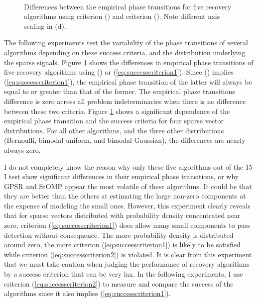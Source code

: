 \documentclass[11pt,draftcls,onecolumn]{IEEEtran}
\begin{document}
\begin{figure}[tb]
\centering
{}\hspace{-0.1in}
\\
\hspace{-0.1in}
\caption{Differences between the empirical phase transitions for 
five recovery algorithms using criterion ()
and criterion ().
Note different axis scaling in (d).}
\label{fig:Phasedifferencesrecoverycriterion}
\end{figure}

The following experiments test the variability of the phase transitions of
several algorithms depending on these success criteria,
and the distribution underlying the sparse signals.
Figure \ref{fig:Phasedifferencesrecoverycriterion} 
shows the differences in empirical phase transitions of five 
recovery algorithms using () or (\ref{eq:successcriterion1}).
Since () implies (\ref{eq:successcriterion1}),
the empirical phase transition of the latter will always be equal to or greater 
than that of the former.
The empirical phase transitions difference is zero across all problem indeterminacies
when there is no difference between these two criteria.
Figure \ref{fig:Phasedifferencesrecoverycriterion} shows 
a significant dependence of the empirical phase transition
and the success criteria for four sparse vector distributions.
For all other algorithms, and the three other distributions
(Bernoulli, bimodal uniform, and bimodal Gaussian),
the differences are nearly always zero.

I do not completely know the reason why only these five algorithms
out of the 15 I test show significant differences in their empirical phase transitions,
or why GPSR and StOMP appear the most volatile of these algorithms.
It could be that they are better than the others at estimating
the large non-zero components at the expense of modeling the small ones.
However, this experiment clearly reveals that for sparse vectors distributed with
probability density concentrated near zero, criterion (\ref{eq:successcriterion1}) does allow
many small components to pass detection without consequence.
The more probability density is distributed around zero,
the more criterion (\ref{eq:successcriterion1}) is likely to be satisfied
while criterion (\ref{eq:successcriterion2}) is violated.
It is clear from this experiment that we must take caution when
judging the performance of recovery algorithms 
by a success criterion that can be very lax.
In the following experiments,
I use criterion (\ref{eq:successcriterion2}) 
to measure and compare the success of the algorithms
since it also implies (\ref{eq:successcriterion1}).
\end{document}
